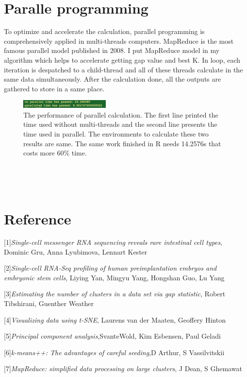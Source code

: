 \documentclass[10pt,journal]{IEEEtran}
\begin{document}
\section{Paralle programming}
To optimize and accelerate the calculation, parallel programming is comprehensively applied in multi-threads computers. MapReduce is the most famous parallel model published in 2008. I put MapReduce model in my algorithm which helps to accelerate getting gap value and best K. In loop, each iteration is despatched to a child-thread and all of these threads calculate in the same data simultaneously. After the calculation done, all the outputs are gathered to store in a same place.
\begin{figure}[H] 
\centering
\includegraphics[width=0.4\textwidth]{fig2/parallel.png} 
\caption{ The performance of parallel calculation. The first line printed the time used without multi-threads and the second line presents the time used in parallel. The environments to calculate these two results are same. The same work finished in R needs 14.2576s that costs more 60\(\%\) time.} 
\label{Fig.9}
\end{figure}

	






\
\

\
\


\section{Reference}



[1]\emph{Single-cell messenger RNA sequencing reveals rare intestinal cell types}, Dominic Gru, Anna Lyubimova, Lennart Kester

[2]\emph{Single-cell RNA-Seq profiling of human preimplantation embryos and embryonic stem cells}, Liying Yan, Mingyu Yang, Hongshan Guo, Lu Yang

[3]\emph{Estimating the number of clusters in a data set via gap statistic}, Robert Tibshirani, Guenther Weather

[4]\emph{Visualizing data using t-SNE}, Laurens van der Maaten, Geoffery Hinton

[5]\emph{Principal component analysis},SvanteWold, Kim Esbensen, Paul Geladi

[6]\emph{k-means++: The advantages of careful seeding},D Arthur, S Vassilvitskii

[7]\emph{MapReduce: simplified data processing on large clusters}, J Dean, S Ghemawat 
\end{document}
